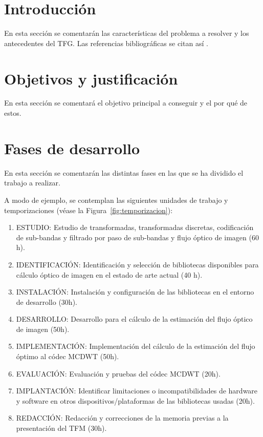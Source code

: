 \documentclass[titlepage, 12pt, a4paper, oneside]{article}
\begin{document}
\normalsize

\section{Introducción}
En esta sección se comentarán las características del problema a resolver y los antecedentes del TFG. Las referencias bibliográficas se citan así \cite{einstein1922kosmologische}.

\section{Objetivos y justificación}
En esta sección se comentará el objetivo principal a conseguir y el por qué de estos.

\section{Fases de desarrollo}
En esta sección se comentarán las distintas fases en las que se ha dividido el trabajo a realizar.

A modo de ejemplo, se contemplan las siguientes unidades de trabajo y
temporizaciones (véase la Figura~\ref{fig:temporizacion}):
\begin{enumerate}
  \item {ESTUDIO:} Estudio de transformadas, transformadas discretas,
    codificación de sub-bandas y filtrado por paso de sub-bandas y
    flujo óptico de imagen (60 h).
  \item {IDENTIFICACIÓN}: Identificación y selección de bibliotecas disponibles para
    cálculo óptico de imagen en el estado de arte actual (40 h).
  \item {INSTALACIÓN}: Instalación y configuración de las bibliotecas en el entorno
    de desarrollo (30h).
  \item {DESARROLLO}: Desarrollo para el cálculo de la estimación del flujo óptico
    de imagen (50h).
  \item {IMPLEMENTACIÓN}: Implementación del cálculo de la estimación del flujo óptimo
    al códec MCDWT (50h).
  \item {EVALUACIÓN}: Evaluación y pruebas del códec MCDWT (20h).
  \item {IMPLANTACIÓN}: Identificar limitaciones o incompatibilidades de hardware y
    software en otros dispositivos/plataformas de las bibliotecas
    usadas (20h).
  \item {REDACCIÓN}: Redacción y correcciones de la memoria previas a la
    presentación del TFM (30h).
\end{enumerate}
\end{document}
